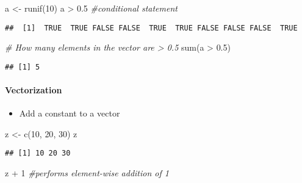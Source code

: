 \documentclass[
]{article}
\newenvironment{Shaded}{\begin{snugshade}}{\end{snugshade}}
\newcommand{\CommentTok}[1]{\textcolor[rgb]{0.56,0.35,0.01}{\textit{#1}}}
\newcommand{\DecValTok}[1]{\textcolor[rgb]{0.00,0.00,0.81}{#1}}
\newcommand{\FloatTok}[1]{\textcolor[rgb]{0.00,0.00,0.81}{#1}}
\newcommand{\FunctionTok}[1]{\textcolor[rgb]{0.00,0.00,0.00}{#1}}
\newcommand{\NormalTok}[1]{#1}
\newcommand{\OtherTok}[1]{\textcolor[rgb]{0.56,0.35,0.01}{#1}}
\newcommand{\SpecialCharTok}[1]{\textcolor[rgb]{0.00,0.00,0.00}{#1}}
\providecommand{\tightlist}{%
  \setlength{\itemsep}{0pt}\setlength{\parskip}{0pt}}
\begin{document}
\begin{Shaded}
\begin{Highlighting}[]
\NormalTok{a }\OtherTok{\textless{}{-}} \FunctionTok{runif}\NormalTok{(}\DecValTok{10}\NormalTok{)}
\NormalTok{a }\SpecialCharTok{\textgreater{}} \FloatTok{0.5} \CommentTok{\#conditional statement}
\end{Highlighting}
\end{Shaded}

\begin{verbatim}
##  [1]  TRUE  TRUE FALSE FALSE  TRUE  TRUE FALSE FALSE FALSE  TRUE
\end{verbatim}

\begin{Shaded}
\begin{Highlighting}[]
\CommentTok{\# How many elements in the vector are \textgreater{} 0.5}
\FunctionTok{sum}\NormalTok{(a }\SpecialCharTok{\textgreater{}} \FloatTok{0.5}\NormalTok{)}
\end{Highlighting}
\end{Shaded}

\begin{verbatim}
## [1] 5
\end{verbatim}

\hypertarget{vectorization}{%
\paragraph{Vectorization}\label{vectorization}}

\begin{itemize}
\tightlist
\item
  Add a constant to a vector
\end{itemize}

\begin{Shaded}
\begin{Highlighting}[]
\NormalTok{z }\OtherTok{\textless{}{-}} \FunctionTok{c}\NormalTok{(}\DecValTok{10}\NormalTok{, }\DecValTok{20}\NormalTok{, }\DecValTok{30}\NormalTok{)}
\NormalTok{z}
\end{Highlighting}
\end{Shaded}

\begin{verbatim}
## [1] 10 20 30
\end{verbatim}

\begin{Shaded}
\begin{Highlighting}[]
\NormalTok{z }\SpecialCharTok{+} \DecValTok{1} \CommentTok{\#performs element{-}wise addition of 1}
\end{Highlighting}
\end{Shaded}
\end{document}
